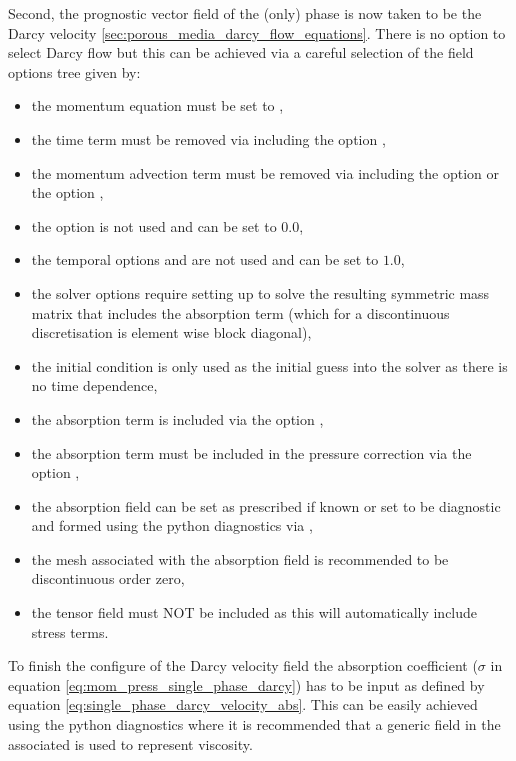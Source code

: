 Second, the prognostic  vector field of the (only) phase is now taken to be the Darcy velocity \ref{sec:porous_media_darcy_flow_equations}. There is no option to select Darcy flow but this can be achieved via a careful selection of the  field options tree given by:
\begin{itemize}
\item the momentum equation must be set to ,
\item the time term must be removed via including the option ,
\item the momentum advection term must be removed via including the option  or the option ,
\item the option  is not used and can be set to $0.0$,
\item the temporal options  and  are not used and can be set to $1.0$,
\item the solver options require setting up to solve the resulting symmetric mass matrix that includes the absorption term (which for a discontinuous discretisation is element wise block diagonal),
\item the initial condition is only used as the initial guess into the solver as there is no time dependence,
\item the absorption term is included via the option ,
\item the absorption term must be included in the pressure correction via the option ,
\item the absorption field can be set as prescribed if known or set to be diagnostic and formed using the python diagnostics via ,
\item the mesh associated with the absorption field is recommended to be discontinuous order zero, 
\item the tensor field  must NOT be included as this will automatically include stress terms.
\end{itemize}
To finish the configure of the Darcy velocity field the absorption coefficient ($\sigma$ in equation \eqref{eq:mom_press_single_phase_darcy}) has to be input as defined by equation \eqref{eq:single_phase_darcy_velocity_abs}. This can be easily achieved using the python diagnostics where it is recommended that a generic field in the associated  is used to represent viscosity.

